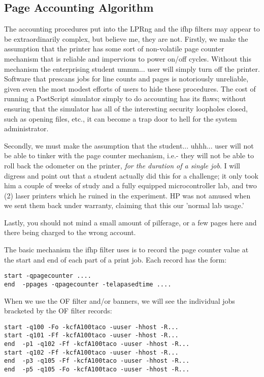 \documentclass[a4paper]{article}
\begin{document}
\subsection{Page Accounting Algorithm}

The accounting procedures put into the LPRng and the ifhp filters may
appear to be extraordinarily complex,  but believe me, they are not.
Firstly, we make the assumption that the printer has some sort of
non-volatile page counter mechanism that is reliable and impervious to
power on/off cycles.  Without this mechanism the enterprising student
ummm... user will simply turn off the printer.  Software that prescans
jobs for line counts and pages is notoriously unreliable,  given even
the most modest efforts of users to hide these procedures.   The cost
of running a PostScript simulator simply to do accounting has its
flaws; without ensuring that the simulator has all of the interesting
security loopholes closed, such as opening files, etc.,  it can become
a trap door to hell for the system administrator.

Secondly,  we must make the assumption that the student... uhhh...
user will not be able to tinker with the page counter mechanism, i.e.-
they will not be able to roll back the odometer on the printer,
{\itshape for the duration of a single job\/}.
I will digress and point out that a student
actually did this for a challenge;  it only took him a couple of weeks
of study and a fully equipped microcontroller lab, and two (2) laser
printers which he ruined in the experiment.
HP was not amused when we
sent them back under warranty,  claiming that this our 'normal lab usage.'

Lastly,  you should not mind a small amount of pilferage, or a few
pages here and there being charged to the wrong account.

The basic mechanism the ifhp filter uses is to record the page
counter value at the start and end of each part of a print job. Each
record has the form:
\begin{tscreen}
\begin{verbatim}
start -qpagecounter ....
end  -ppages -qpagecounter -telapasedtime ....
\end{verbatim}
\end{tscreen}


When we use the OF filter and/or banners,  we will see the
individual jobs bracketed by the OF filter records:
\begin{tscreen}
\begin{verbatim}
start -q100 -Fo -kcfA100taco -uuser -hhost -R...  
start -q101 -Ff -kcfA100taco -uuser -hhost -R...  
end  -p1 -q102 -Ff -kcfA100taco -uuser -hhost -R...  
start -q102 -Ff -kcfA100taco -uuser -hhost -R...
end  -p3 -q105 -Ff -kcfA100taco -uuser -hhost -R...  
end  -p5 -q105 -Fo -kcfA100taco -uuser -hhost -R...
\end{verbatim}
\end{tscreen}
\end{document}
